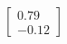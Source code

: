 \documentclass[preview]{standalone}
\begin{document}
\begin{align*}
\begin{bmatrix} 0.79 \\ -0.12 \end{bmatrix}
\end{align*}
\end{document}

